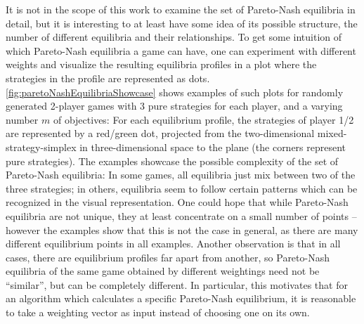 \documentclass[a4paper]{scrreprt}
\begin{document}
    It is not in the scope of this work to examine the set of Pareto-Nash equilibria in detail, but it is interesting to at least have some idea of its possible structure, 
    the number of different equilibria and their relationships.
    To get some intuition of which Pareto-Nash equilibria a game can have, one can experiment with different weights and visualize the resulting equilibria profiles in a plot where the strategies in the profile are represented as dots.
    \autoref{fig:paretoNashEquilibriaShowcase} %
    shows examples of such plots for randomly generated 2-player games with 3 pure strategies for each player, and a varying number $m$ of objectives: For each equilibrium profile, the strategies of player 1/2 are represented by a red/green dot, projected from the two-dimensional mixed-strategy-simplex in three-dimensional space to the plane 
    (the corners represent pure strategies).
    The examples showcase the possible complexity of the set of Pareto-Nash equilibria:
    In some games, all equilibria just mix between two of the three strategies; in others, equilibria seem to follow certain patterns which can be recognized in the visual representation.
    One could hope that while Pareto-Nash equilibria are not unique, they at least concentrate on a small number of points -- however the examples show that this is not the case in general, as there are many different equilibrium points in all examples.
    Another observation is that in all cases, there are equilibrium profiles far apart from another, so Pareto-Nash equilibria of the same game obtained by different weightings need not be “similar”, but can be completely different.
    In particular, this motivates that for an algorithm which calculates a specific Pareto-Nash equilibrium, it is reasonable to take a weighting vector as input instead of choosing one on its own.
\end{document}
